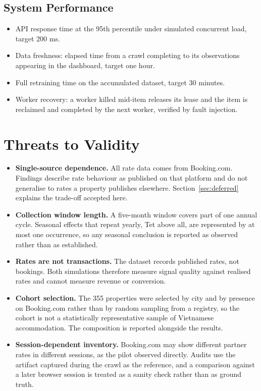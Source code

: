\subsection{System Performance}

\begin{itemize}[leftmargin=*]
    \item API response time at the 95th percentile under simulated concurrent load, target 200 ms.
    \item Data freshness: elapsed time from a crawl completing to its observations appearing in the dashboard, target one hour.
    \item Full retraining time on the accumulated dataset, target 30 minutes.
    \item Worker recovery: a worker killed mid-item releases its lease and the item is reclaimed and completed by the next worker, verified by fault injection.
\end{itemize}

\section{Threats to Validity}

\begin{itemize}[leftmargin=*]
    \item \textbf{Single-source dependence.} All rate data comes from Booking.com. Findings describe rate behaviour as published on that platform and do not generalise to rates a property publishes elsewhere. Section~\ref{sec:deferred} explains the trade-off accepted here.

    \item \textbf{Collection window length.} A five-month window covers part of one annual cycle. Seasonal effects that repeat yearly, Tet above all, are represented by at most one occurrence, so any seasonal conclusion is reported as observed rather than as established.

    \item \textbf{Rates are not transactions.} The dataset records published rates, not bookings. Both simulations therefore measure signal quality against realised rates and cannot measure revenue or conversion.

    \item \textbf{Cohort selection.} The 355 properties were selected by city and by presence on Booking.com rather than by random sampling from a registry, so the cohort is not a statistically representative sample of Vietnamese accommodation. The composition is reported alongside the results.

    \item \textbf{Session-dependent inventory.} Booking.com may show different partner rates in different sessions, as the pilot observed directly. Audits use the artifact captured during the crawl as the reference, and a comparison against a later browser session is treated as a sanity check rather than as ground truth.
\end{itemize}
